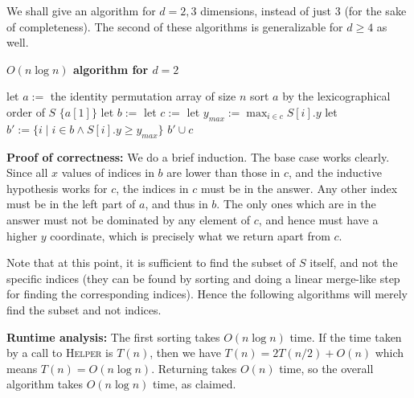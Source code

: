 \documentclass[answers]{exam}
\begin{document}
\begin{questions}

\begin{solution}
    We shall give an algorithm for $d = 2, 3$ dimensions, instead of just 3 (for the sake of completeness). The second of these algorithms is generalizable for $d \ge 4$ as well.

    \textbf{$O(n \log n)$ algorithm for $d = 2$}
    \begin{algorithmic}
            \State let $a := $ the identity permutation array of size $n$
            \State sort $a$ by the lexicographical order of $S$
                    \State \Return $\{a[1]\}$
                \EndIf
                \State let $b := $ 
                \State let $c := $ 
                \State let $y_{max} := \max_{i \in c} S[i].y$
                \State let $b' := \{i \mid i \in b \land S[i].y \ge y_{max}\}$
                \State \Return $b' \cup c$
            \EndFunction
            \State \Return {}
        \EndFunction
    \end{algorithmic}

    \textbf{Proof of correctness:}
    We do a brief induction. The base case works clearly. Since all $x$ values of indices in $b$ are lower than those in $c$, and the inductive hypothesis works for $c$, the indices in $c$ must be
    in the answer. Any other index must be in the left part of $a$, and thus in $b$. The only ones which are in the answer must not be dominated by any element of $c$, and hence must have a higher
    $y$ coordinate, which is precisely what we return apart from $c$.

    Note that at this point, it is sufficient to find the subset of $S$ itself, and not the specific indices (they can be found by sorting and doing a linear merge-like step for finding
    the corresponding indices). Hence the following algorithms will merely find the subset and not indices.

    \textbf{Runtime analysis:}
    The first sorting takes $O(n \log n)$ time. If the time taken by a call to \textsc{Helper} is $T(n)$, then we have $T(n) = 2T(n/2) + O(n)$ which means $T(n) = O(n \log n)$. Returning takes $O(n)$
    time, so the overall algorithm takes $O(n \log n)$ time, as claimed.


\end{solution}
\end{questions}
\end{document}
